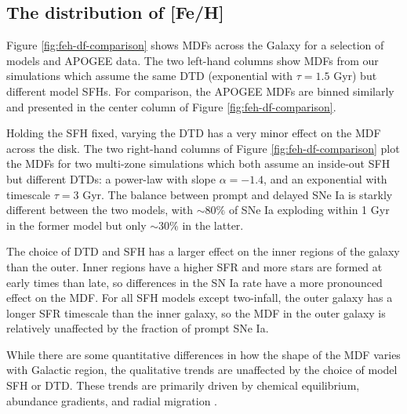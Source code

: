 \documentclass[twocolumn,twocolappendix,linenumbers,trackchanges]{aastex631}
\begin{document}
\subsection{The distribution of [Fe/H]}

Figure \ref{fig:feh-df-comparison} shows MDFs across the Galaxy for a selection of models and APOGEE data. The two left-hand columns show MDFs from our simulations which assume the same DTD (exponential with $\tau=1.5$ Gyr) but different model SFHs. For comparison, the APOGEE MDFs are binned similarly and presented in the center column of Figure \ref{fig:feh-df-comparison}. 

Holding the SFH fixed, varying the DTD has a very minor effect on the MDF across the disk. The two right-hand columns of Figure \ref{fig:feh-df-comparison} plot the MDFs for two multi-zone simulations which both assume an inside-out SFH but different DTDs: a power-law with slope $\alpha=-1.4$, and an exponential with timescale $\tau=3$ Gyr. The balance between prompt and delayed SNe Ia is starkly different between the two models, with $\sim 80\%$ of SNe Ia exploding within 1 Gyr in the former model but only $\sim 30\%$ in the latter.

The choice of DTD and SFH has a larger effect on the inner regions of the galaxy than the outer. Inner regions have a higher SFR and more stars are formed at early times than late, so differences in the SN Ia rate have a more pronounced effect on the MDF. For all SFH models except two-infall, the outer galaxy has a longer SFR timescale than the inner galaxy, so the MDF in the outer galaxy is relatively unaffected by the fraction of prompt SNe Ia.

While there are some quantitative differences in how the shape of the MDF varies with Galactic region, the qualitative trends are unaffected by the choice of model SFH or DTD. These trends are primarily driven by chemical equilibrium, abundance gradients, and radial migration \citep[][see their Section 3.2 for further discussion]{Johnson2021-Migration}.
\end{document}
